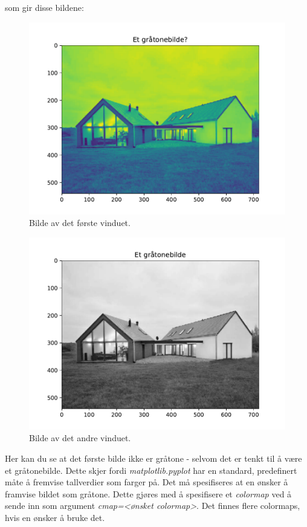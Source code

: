 \documentclass[%
oneside,                 %
final,                   %
10pt]{article}
\begin{document}
som gir disse bildene:


\begin{figure}[H]  %
  \centerline{\includegraphics[width=0.9\linewidth]{Figure_1.pdf}}
  \caption{
  Bilde av det første vinduet.
  }
\end{figure}



\begin{figure}[H]  %
  \centerline{\includegraphics[width=0.9\linewidth]{Figure_2.pdf}}
  \caption{
  Bilde av det andre vinduet.
  }
\end{figure}


Her kan du se at det første bilde ikke er gråtone - selvom det er tenkt til å være et gråtonebilde. Dette skjer fordi \emph{matplotlib.pyplot} har en standard, predefinert måte å fremvise tallverdier som farger på.
Det må spesifiseres at en ønsker å framvise bildet som gråtone. Dette gjøres med å spesifisere et \emph{colormap} ved å sende inn som argument \emph{cmap=<ønsket colormap>}. Det finnes flere colormaps, hvis en ønsker å bruke det.
\end{document}
